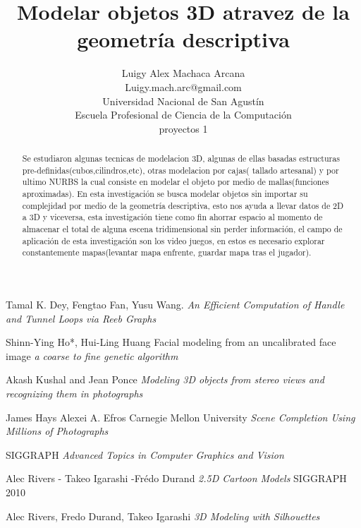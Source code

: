 \documentclass[a4paper,10pt]{article}
\title{\huge{Modelar objetos 3D atravez de la geometría descriptiva }}
\author{ \Large Luigy Alex Machaca Arcana \\Luigy.mach.arc@gmail.com \\ Universidad Nacional de San Agustín \\ Escuela Profesional de Ciencia de la Computación \\ proyectos 1 }
\begin{document}
\maketitle
\begin{abstract}
Se estudiaron algunas tecnicas de modelacion 3D, algunas de ellas basadas estructuras pre-definidas(cubos,cilindros,etc), otras modelacion por cajas( tallado artesanal) y por ultimo NURBS la cual consiste en modelar el objeto por medio de mallas(funciones aproximadas).
En esta investigación se busca modelar objetos sin importar su complejidad por medio de la geometría descriptiva, esto nos ayuda a llevar datos de 2D a 3D y viceversa, esta investigación tiene como fin ahorrar espacio al momento de almacenar el total de alguna escena tridimensional sin perder información, el campo de aplicación de esta investigación son los video juegos, en estos es necesario explorar constantemente mapas(levantar mapa enfrente, guardar mapa tras el jugador).


\end{abstract}
	
	

\newpage
	\begin{thebibliography}{9}


Tamal K. Dey, Fengtao Fan, Yusu Wang.
\textit{An Efficient Computation of Handle and Tunnel Loops via Reeb Graphs}


Shinn-Ying Ho*, Hui-Ling Huang
Facial modeling from an uncalibrated face image
\textit{a coarse to fine genetic algorithm}

Akash Kushal and Jean Ponce
\textit{Modeling 3D objects from stereo views and recognizing them in photographs}

James Hays Alexei A. Efros
Carnegie Mellon University
\textit{Scene Completion Using Millions of Photographs}

SIGGRAPH
\textit{Advanced Topics in Computer Graphics and Vision}

Alec Rivers - Takeo Igarashi -Frédo Durand
\textit{2.5D Cartoon Models}
SIGGRAPH 2010


Alec Rivers, Fredo Durand, Takeo Igarashi
\textit{3D Modeling with Silhouettes}



	\end{thebibliography}
	
	
	
\end{document}
